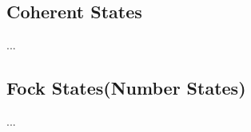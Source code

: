 \documentclass[english, a4paper, 12pt, twoside]{article}
\numberwithin{equation}{section} %
\begin{document}
\subsection{Coherent States}
...
\subsection{Fock States(Number States)}
...







\end{document}

